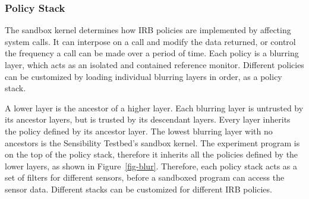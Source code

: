 \subsubsection{Policy Stack}
The sandbox kernel determines how IRB policies are implemented by affecting system calls. It can
interpose on a call and modify the data returned, or control the frequency a call can be made over
a period of time. 
%
Each policy is a blurring layer, which acts as an isolated and 
contained reference monitor. Different policies can be customized 
by loading individual blurring layers in order, as a policy stack. 

A lower layer is the ancestor of 
a higher layer. Each blurring layer is untrusted by its ancestor layers, 
but is trusted by its descendant layers. Every layer inherits the policy 
defined by its ancestor layer. The lowest blurring layer with no ancestors is the 
Sensibility Testbed's sandbox kernel. The experiment program is on the top 
of the policy stack, therefore it inherits all the policies defined by the
lower layers, as shown in Figure~\ref{fig-blur}. 
Therefore, each policy stack acts as a set 
of filters for different sensors, before a sandboxed program can
access the sensor data. Different stacks can be customized for 
different IRB policies.



